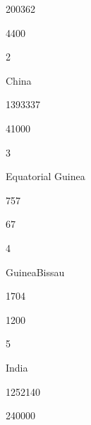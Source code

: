 \documentclass[letterpaper,10pt,english]{sphinxmanual}
\begin{document}
200362





4400









2





China





1393337





41000









3





Equatorial Guinea





757





67









4





Guinea\sphinxhyphen{}Bissau





1704





1200









5





India





1252140





240000
\end{document}

